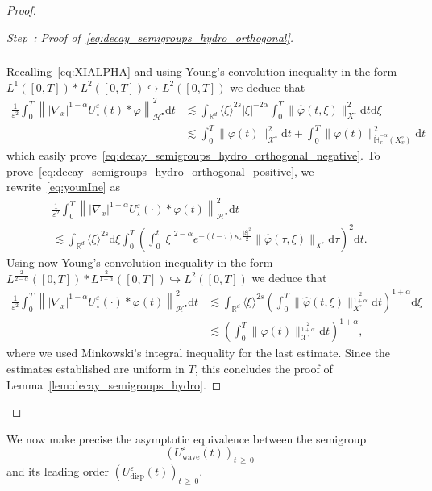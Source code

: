 \documentclass[AHL,Unicode,longabstracts,published]{cedram}
\renewcommand{\d}{\mathrm{d}}
\newcommand{\Wave}{\mathrm{wave}}
\newcommand{\disp}{\mathrm{disp}}
\newcommand{\R}{\mathbb{R}}
\newcommand{\bbH}{\mathbb{H}}
\newcommand{\XX}{\mathcal{X}}
\newcommand{\HH}{\mathcal{H}}
\newcommand{\SSsp}{\HH^{\bullet}}
\newcommand{\Slm}{X^{\circ}}
\newcommand{\SSlm}{\XX^{\circ}}
\renewcommand*\ge{\geqslant}
\renewcommand*\geq{\geqslant}
\newcommand*\eps{{\varepsilon}}
\newcommand{\la}{\langle}
\newcommand{\ra}{\rangle}
\newcounter{stepcount}
\newenvironment{step}[1]{\refstepcounter{stepcount}\begin{proof}[Step~\thestepcount: #1]}{\let\qed\relax\end{proof}}
\begin{document}
\begin{proof}
\begin{step}{{Proof of~\eqref{eq:decay_semigroups_hydro_orthogonal}}}
\begin{multline}
\begin{aligned}
\end{aligned}
\end{multline}
Recalling~\eqref{eq:XIALPHA} and using Young's convolution inequality in the form $L^1([0, T] ) \ast L^2([0, T]) \hookrightarrow L^2([0, T])$ we deduce that
\begin{align*}
\frac{1}{\eps^2} \int_0^T \left\| |\nabla_x|^{1-\alpha} U^\eps_\star(t) * \varphi \right\|_{\SSsp}^2 \d t & \lesssim \int_{\R^{d}} \la \xi \ra^{2 s} | \xi |^{-2\alpha} \int_0^T \| \widehat{\varphi}(t, \xi) \|_{\Slm}^2 \d t \d \xi \\
& \lesssim \int_0^T \| \varphi(t) \|_{\SSlm}^2 \d t + \int_0^T \| \varphi(t) \|_{ \dot{\bbH}^{-\alpha}_x \left(\Slm_v\right) }^2 \d t\,
\end{align*}
which easily prove~\eqref{eq:decay_semigroups_hydro_orthogonal_negative}. To prove~\eqref{eq:decay_semigroups_hydro_orthogonal_positive}, we rewrite~\eqref{eq:younIne} as
\begin{multline*}
\frac{1}{\eps^2} \int_0^T\left \| |\nabla_x|^{1-\alpha}  U^\eps_\star(\cdot) * \varphi(t) \right\|_{\SSsp}^2 \d t
\\
 \lesssim \int_{\R^d}\langle \xi\rangle^{2s}\d \xi\int_0^T \left(\int_0^t |\xi|^{2-\alpha}e^{-(t-\tau)\kappa_{\star}\frac{|\xi|^2}{2}}\|\widehat{\varphi}(\tau,\xi)\|_{\Slm}\d\tau\right)^2\d t.
\end{multline*}
Using now Young's convolution inequality in the form $L^{\frac{2}{2-\alpha}}([0, T]) \ast L^{\frac{2}{1+\alpha}}([0, T]) \hookrightarrow L^2([0, T])$ we deduce that
\begin{align*}
\frac{1}{\eps^2} \int_0^T \left\| |\nabla_x|^{1-\alpha} U^\eps_\star(\cdot) * \varphi(t) \right\|_{\SSsp}^2 \d t & \lesssim \int_{\R^{d}} \la \xi \ra^{2 s} \left(\int_0^T \| \widehat{\varphi}(t, \xi) \|_{\Slm}^{\frac{2}{1+\alpha}} \d t\right)^{1+\alpha} \d \xi \\
& \lesssim \left(\int_0^T \| \varphi(t) \|_{\SSlm}^{\frac{2}{1+\alpha}} \d t\right)^{1+\alpha},
\end{align*}
where we used Minkowski's integral inequality for the last estimate. Since the estimates established are uniform in $T$, this concludes the proof of Lemma~\ref{lem:decay_semigroups_hydro}.\qedhere
\end{step}\let\qed\relax
\end{proof}

We now make precise the asymptotic equivalence between the semigroup
\[
(U^{\eps}_{\Wave}(t))_{t\,\ge\,0}
\]
and its leading order $(U^{\eps}_{\disp}(t))_{t\,\geq\,0}$.
\end{document}
